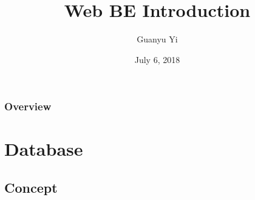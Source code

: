 \documentclass{beamer}
\title[Web Development Backend Introduction]{Web BE Introduction} %
\author{Guanyu Yi} %
\institute[Alchip] %
{
  OP Team, Alchip, Inc. \\ %
  \medskip
  \textit{guanyu\_yi@alchip.com} %
}
\date{July 6, 2018} %
\begin{document}
\begin{frame}
  \titlepage %
\end{frame}

\begin{frame}
  \frametitle{Overview} %
  \tableofcontents[subsectionstyle=hide] %
\end{frame}


\section{Database} %

\subsection{Concept}
\end{document}
